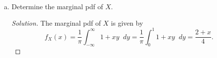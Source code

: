 \documentclass[12pt]{article}
\newenvironment{solution}
{\renewcommand\qedsymbol{$\blacksquare$}\begin{proof}[Solution]}
{\end{proof}}
\begin{document}
\begin{enumerate}
\begin{enumerate}[(a)]
\begin{solution}
                        of the plane $y>1-x$ and the upper half of the unit
                        disc. To integrate over this region, note that for any
                        $0\leq\theta\leq\pi/2$, we have that 
                        \begin{equation*}
                            \sqrt{\cos^2\theta+(1-\cos\theta)^2}\leq r\leq 1. 
                        \end{equation*}
                        Letting
                        $f(\theta)=\sqrt{\cos^2\theta+(1-\cos\theta)^2}$, then
                        we have that 
                        \begin{align*}
                            P(X+Y>1)&=\frac{1}{\pi}\int_{0}^{\pi/2}\int_{f(\theta)}^{1}1
                            +r^2\cos\theta\sin\theta\;\;dr d\theta \\
                            &=\frac{1}{\pi}\int_{0}^{\pi/2}\big(1-f(\theta)
                            +\frac{1}{3}\cos\theta\sin\theta(1-(f(\theta))^3)\big)d\theta
                            \\
                            &=\frac{1}{\pi}\bigg[\int_{0}^{\pi/2}
                            1-\sqrt{\cos^2\theta+(1-\cos\theta)^2}d\theta \\
                            &\;\;\;\;\;\;\;\;+\int_{0}^{\pi/2}\frac{1}{3}
                            \cos\theta\sin\theta(1-(\cos^2\theta+(1-\cos\theta)^2)^{3/2})
                            d\theta\bigg] \\
                            &\approx\frac{1}{\pi}(0.241253+0.0742742) \\
                            &\approx 0.100435.
                        \end{align*}
                    \end{solution}
                \item Determine the marginal pdf of $X$. 
                    \begin{solution}
                        The marginal pdf of $X$ is given by 
                        \begin{equation*}
                            f_X(x)=\frac{1}{\pi}\int_{-\infty}^{\infty}1+xy\;\;dy
                            =\frac{1}{\pi}\int_{0}^{1}1+xy\;\;dy=\frac{2+x}{4}.
                        \end{equation*}
                    \end{solution}
            \end{enumerate}
    \end{enumerate}
\end{document}
